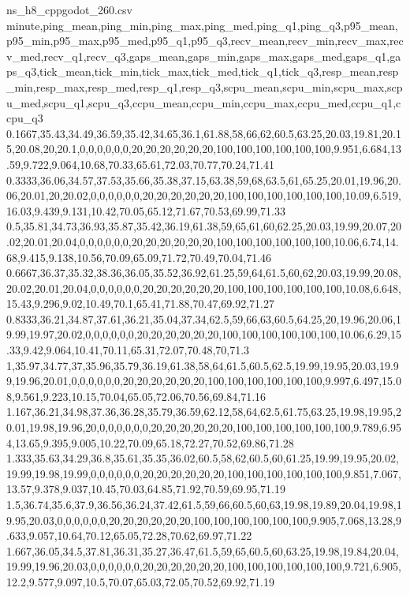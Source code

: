 \begin{filecontents*}[overwrite]{ns_h8_cppgodot_260.csv}
minute,ping_mean,ping_min,ping_max,ping_med,ping_q1,ping_q3,p95_mean,p95_min,p95_max,p95_med,p95_q1,p95_q3,recv_mean,recv_min,recv_max,recv_med,recv_q1,recv_q3,gaps_mean,gaps_min,gaps_max,gaps_med,gaps_q1,gaps_q3,tick_mean,tick_min,tick_max,tick_med,tick_q1,tick_q3,resp_mean,resp_min,resp_max,resp_med,resp_q1,resp_q3,scpu_mean,scpu_min,scpu_max,scpu_med,scpu_q1,scpu_q3,ccpu_mean,ccpu_min,ccpu_max,ccpu_med,ccpu_q1,ccpu_q3
0.1667,35.43,34.49,36.59,35.42,34.65,36.1,61.88,58,66,62,60.5,63.25,20.03,19.81,20.15,20.08,20,20.1,0,0,0,0,0,0,20,20,20,20,20,20,100,100,100,100,100,100,9.951,6.684,13.59,9.722,9.064,10.68,70.33,65.61,72.03,70.77,70.24,71.41
0.3333,36.06,34.57,37.53,35.66,35.38,37.15,63.38,59,68,63.5,61,65.25,20.01,19.96,20.06,20.01,20,20.02,0,0,0,0,0,0,20,20,20,20,20,20,100,100,100,100,100,100,10.09,6.519,16.03,9.439,9.131,10.42,70.05,65.12,71.67,70.53,69.99,71.33
0.5,35.81,34.73,36.93,35.87,35.42,36.19,61.38,59,65,61,60,62.25,20.03,19.99,20.07,20.02,20.01,20.04,0,0,0,0,0,0,20,20,20,20,20,20,100,100,100,100,100,100,10.06,6.74,14.68,9.415,9.138,10.56,70.09,65.09,71.72,70.49,70.04,71.46
0.6667,36.37,35.32,38.36,36.05,35.52,36.92,61.25,59,64,61.5,60,62,20.03,19.99,20.08,20.02,20.01,20.04,0,0,0,0,0,0,20,20,20,20,20,20,100,100,100,100,100,100,10.08,6.648,15.43,9.296,9.02,10.49,70.1,65.41,71.88,70.47,69.92,71.27
0.8333,36.21,34.87,37.61,36.21,35.04,37.34,62.5,59,66,63,60.5,64.25,20,19.96,20.06,19.99,19.97,20.02,0,0,0,0,0,0,20,20,20,20,20,20,100,100,100,100,100,100,10.06,6.29,15.33,9.42,9.064,10.41,70.11,65.31,72.07,70.48,70,71.3
1,35.97,34.77,37,35.96,35.79,36.19,61.38,58,64,61.5,60.5,62.5,19.99,19.95,20.03,19.99,19.96,20.01,0,0,0,0,0,0,20,20,20,20,20,20,100,100,100,100,100,100,9.997,6.497,15.08,9.561,9.223,10.15,70.04,65.05,72.06,70.56,69.84,71.16
1.167,36.21,34.98,37.36,36.28,35.79,36.59,62.12,58,64,62.5,61.75,63.25,19.98,19.95,20.01,19.98,19.96,20,0,0,0,0,0,0,20,20,20,20,20,20,100,100,100,100,100,100,9.789,6.954,13.65,9.395,9.005,10.22,70.09,65.18,72.27,70.52,69.86,71.28
1.333,35.63,34.29,36.8,35.61,35.35,36.02,60.5,58,62,60.5,60,61.25,19.99,19.95,20.02,19.99,19.98,19.99,0,0,0,0,0,0,20,20,20,20,20,20,100,100,100,100,100,100,9.851,7.067,13.57,9.378,9.037,10.45,70.03,64.85,71.92,70.59,69.95,71.19
1.5,36.74,35.6,37.9,36.56,36.24,37.42,61.5,59,66,60.5,60,63,19.98,19.89,20.04,19.98,19.95,20.03,0,0,0,0,0,0,20,20,20,20,20,20,100,100,100,100,100,100,9.905,7.068,13.28,9.633,9.057,10.64,70.12,65.05,72.28,70.62,69.97,71.22
1.667,36.05,34.5,37.81,36.31,35.27,36.47,61.5,59,65,60.5,60,63.25,19.98,19.84,20.04,19.99,19.96,20.03,0,0,0,0,0,0,20,20,20,20,20,20,100,100,100,100,100,100,9.721,6.905,12.2,9.577,9.097,10.5,70.07,65.03,72.05,70.52,69.92,71.19

\end{filecontents*}
